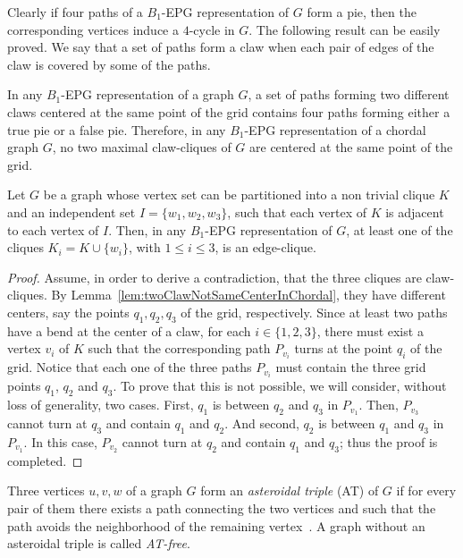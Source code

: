 \documentclass{dmgt}
\begin{document}
Clearly if four paths of a $B_1$-EPG representation of $G$ form a pie, then the corresponding vertices induce a $4$-cycle in $G$. %
The following result can be easily proved. We say that a set of paths form a claw when each pair of edges of the claw is covered by some of the paths.

\begin{lemma}\label{lem:twoClawNotSameCenterInChordal}
In any $B_1$-EPG representation of a graph $G$, a set of paths forming two different claws centered at the same point of the grid contains four paths forming either a true pie or a false pie. Therefore, in any $B_1$-EPG representation of a chordal graph $G$, no two maximal claw-cliques of $G$ are centered at the same point of the grid.
\end{lemma}

\begin{lemma}\label{lem:3cliquesNotClaw}
Let $G$ be a graph whose vertex set  can be
partitioned into a non trivial clique $K$ and an independent set $I=\{w_1,w_2,w_3\}$, such that each vertex of $K$ is adjacent to each vertex of $I$. Then, in any $B_1$-EPG representation of $G$, at least one of the cliques  $K_i = K \cup \{w_i\}$, with $1 \leq i \leq 3$,  is an edge-clique. 
\end{lemma}

\begin{proof}
Assume, in order to derive a contradiction, that the three cliques are claw-cliques. By Lemma~\ref{lem:twoClawNotSameCenterInChordal}, they have different centers, say the points $q_1, q_2, q_3$ of the grid, respectively. Since at least two paths have a bend at the center of a claw, for each $i\in\{1,2,3\}$,   there must exist a vertex
  $v_i$ of $K$ such that the corresponding path $P_{v_i}$ turns at the point $q_i$ of the grid.  Notice that each one of the three paths $P_{v_i}$
  must contain  the three grid points $q_1$, $q_2$ and $q_3$. To prove that this is not possible, we will consider, without loss of generality, two cases.
  First,  $q_1$ is between $q_2$ and $q_3$ in $P_{v_1}$. Then, $P_{v_3}$ cannot turn at $q_3$ and contain $q_1$ and $q_2$.   And second,
  $q_2$ is between $q_1$ and $q_3$ in $P_{v_1}$. In this case, $P_{v_2}$ cannot turn at $q_2$ and contain $q_1$ and $q_3$; thus the proof is completed.
 \hfill 
\end{proof}

Three vertices $u, v, w$ of a graph $G$ form an \textit{asteroidal triple} (AT) of $G$ if for every pair of them there exists a path connecting the two vertices and such that the path avoids the neighborhood of the remaining vertex~\cite{Asinowski2009}. A graph without an asteroidal triple is called \textit{AT-free}. 
\end{document}

